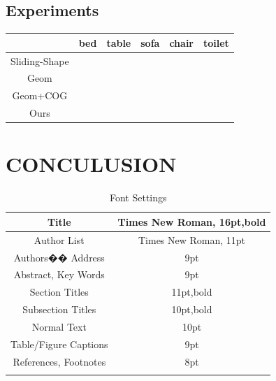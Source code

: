\documentclass[english]{ccdconf}
\begin{document}
\subsection{Experiments}
\begin{table}
	\centering
	\begin{tabular}{|c|c|c|c|c|c|}
	\hhline 
	&bed  &table  &sofa  &chair  &toilet  \\ 
	\hline 
	Sliding-Shape&  &  &  &  &  \\ 
	\hline 
	Geom&  &  &  &  &  \\ 
	\hline 
	Geom+COG&  &  &  &  &  \\ 
	\hline
	Ours& & & & &\\
	\hline 
	\end{tabular} 
\end{table}
\section{CONCULUSION}

%
\begin{table}
  \centering
  \caption{Font Settings}
  \label{tab2}
  \begin{tabular}{c|c}
    \hhline
    Title           & Times New Roman, 16pt,bold \\ \hline
    Author List         & Times New Roman, 11pt \\ \hline
    Authors�� Address       & 9pt \\ \hline
    Abstract, Key Words     & 9pt \\ \hline
    Section Titles      & 11pt,bold \\ \hline
    Subsection Titles       & 10pt,bold \\ \hline
    Normal Text         & 10pt \\ \hline
    Table/Figure Captions   & 9pt \\ \hline
    References, Footnotes   & 8pt \\
    \hhline
  \end{tabular}
\end{table}
%




\end{document}
